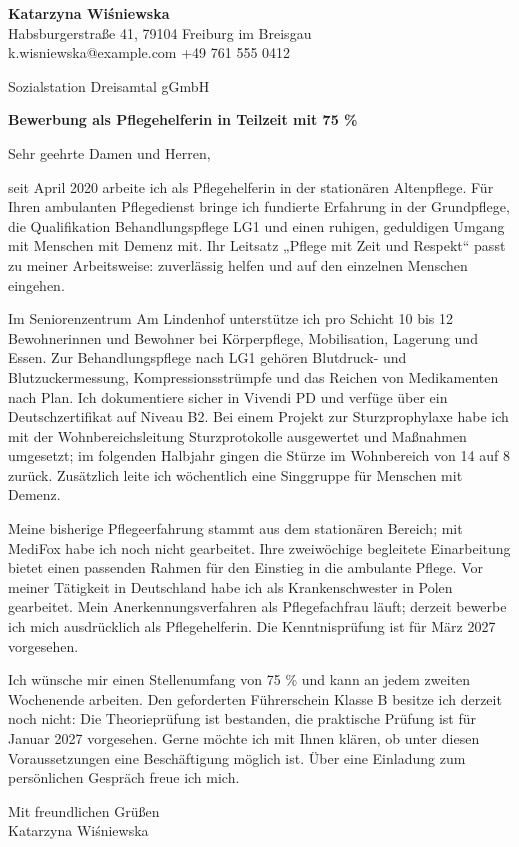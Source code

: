 \documentclass[11pt,a4paper]{article}
\begin{document}
{\bfseries\color{primarycolor} Katarzyna Wiśniewska}\\
Habsburgerstraße 41, 79104 Freiburg im Breisgau\\
k.wisniewska@example.com \textbar{} +49 761 555 0412

Sozialstation Dreisamtal gGmbH

\textbf{\color{primarycolor} Bewerbung als Pflegehelferin in Teilzeit mit 75 \%}

Sehr geehrte Damen und Herren,

seit April 2020 arbeite ich als Pflegehelferin in der stationären Altenpflege. Für Ihren ambulanten Pflegedienst bringe ich fundierte Erfahrung in der Grundpflege, die Qualifikation Behandlungspflege LG1 und einen ruhigen, geduldigen Umgang mit Menschen mit Demenz mit. Ihr Leitsatz „Pflege mit Zeit und Respekt“ passt zu meiner Arbeitsweise: zuverlässig helfen und auf den einzelnen Menschen eingehen.

Im Seniorenzentrum Am Lindenhof unterstütze ich pro Schicht 10 bis 12 Bewohnerinnen und Bewohner bei Körperpflege, Mobilisation, Lagerung und Essen. Zur Behandlungspflege nach LG1 gehören Blutdruck- und Blutzuckermessung, Kompressionsstrümpfe und das Reichen von Medikamenten nach Plan. Ich dokumentiere sicher in Vivendi PD und verfüge über ein Deutschzertifikat auf Niveau B2. Bei einem Projekt zur Sturzprophylaxe habe ich mit der Wohnbereichsleitung Sturzprotokolle ausgewertet und Maßnahmen umgesetzt; im folgenden Halbjahr gingen die Stürze im Wohnbereich von 14 auf 8 zurück. Zusätzlich leite ich wöchentlich eine Singgruppe für Menschen mit Demenz.

Meine bisherige Pflegeerfahrung stammt aus dem stationären Bereich; mit MediFox habe ich noch nicht gearbeitet. Ihre zweiwöchige begleitete Einarbeitung bietet einen passenden Rahmen für den Einstieg in die ambulante Pflege. Vor meiner Tätigkeit in Deutschland habe ich als Krankenschwester in Polen gearbeitet. Mein Anerkennungsverfahren als Pflegefachfrau läuft; derzeit bewerbe ich mich ausdrücklich als Pflegehelferin. Die Kenntnisprüfung ist für März 2027 vorgesehen.

Ich wünsche mir einen Stellenumfang von 75 \% und kann an jedem zweiten Wochenende arbeiten. Den geforderten Führerschein Klasse B besitze ich derzeit noch nicht: Die Theorieprüfung ist bestanden, die praktische Prüfung ist für Januar 2027 vorgesehen. Gerne möchte ich mit Ihnen klären, ob unter diesen Voraussetzungen eine Beschäftigung möglich ist. Über eine Einladung zum persönlichen Gespräch freue ich mich.

Mit freundlichen Grüßen\\[0.5em]
Katarzyna Wiśniewska
\end{document}
